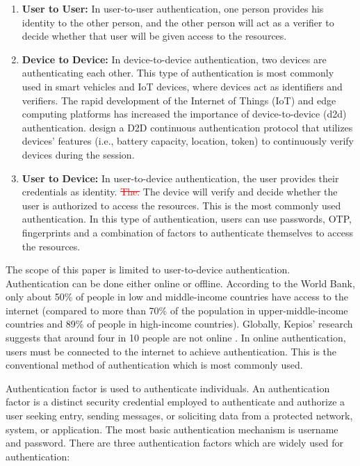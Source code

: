 \documentclass[10pt,journal,compsoc]{IEEEtran}
\begin{document}
 \begin{enumerate}
     \item \textbf{User to User: }In user-to-user authentication, one person provides his identity to the other person, and the other person will act as a verifier to decide whether that user will be given access to the resources.
     \item \textbf{Device to Device: } In device-to-device authentication, two devices are authenticating each other. This type of authentication is most commonly used in smart vehicles and IoT devices, where devices act as identifiers and verifiers. The rapid development of the Internet of Things (IoT) and edge computing platforms has increased the importance of device-to-device (d2d) authentication. \cite{r5} design a D2D continuous authentication protocol that utilizes devices’ features (i.e., battery capacity, location, token) to continuously verify devices during the session.
     \item \textbf{User to Device: }In user-to-device authentication, the user provides their credentials as identity. \textcolor{red}{\sout{The.}} The device will verify and decide whether the user is authorized to access the resources. This is the most commonly used authentication. In this type of authentication, users can use passwords, OTP, fingerprints and a combination of factors to authenticate themselves to access the resources. 
 \end{enumerate}
 The scope of this paper is limited to user-to-device authentication. Authentication can be done either online or offline. According to the World Bank, only about 50\% of people in low and middle-income countries have access to the internet (compared to more than 70\% of the population in upper-middle-income countries and 89\% of people in high-income countries). Globally, Kepios' research suggests that around four in 10 people are not online \cite{anarticle4}. In online authentication, users must be connected to the internet to achieve authentication. This is the conventional method of authentication which is most commonly used.
\par Authentication factor is used to authenticate individuals. An authentication factor is a distinct security credential employed to authenticate and authorize a user seeking entry, sending messages, or soliciting data from a protected network, system, or application. The most basic authentication mechanism is username and password.
There are three authentication factors which are widely used for authentication:\\
\end{document}
